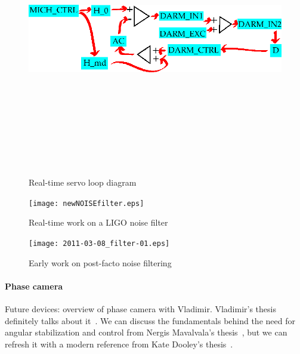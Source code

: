 	\begin{figure}
	\begin{center}
	\includegraphics[height=120mm, width=160mm]{servo_loop.eps}
	\caption{Real-time servo loop diagram}
	\label{servo_loop_realtime}
	\end{center}
	\end{figure}

	\begin{figure}
	\begin{center}
	\texttt{[image: newNOISEfilter.eps]}
	\caption{Real-time work on a LIGO noise filter}
	\label{newNOISEfilter}
	\end{center}
	\end{figure}

	\begin{figure}
	\begin{center}
	\texttt{[image: 2011-03-08\_filter-01.eps]}
	\caption{Early work on post-facto noise filtering}
	\label{filter_early}
	\end{center}
	\end{figure}

                \paragraph{Phase camera}
                \label{phase_camera}

                    Future devices: overview of phase camera with Vladimir. Vladimir's thesis definitely talks about it~\cite{DergachevThesis}. We can discuss the fundamentals behind the need for angular stabilization and control from Nergis Mavalvala's thesis~\cite{MavalvalaThesis}, but we can refresh it with a modern reference from Kate Dooley's thesis~\cite{DooleyThesis}.


